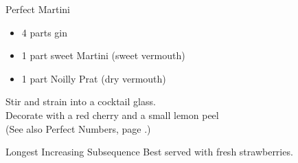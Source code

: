 \begin{algorithm}{Perfect Martini}
\desc
\begin{itemize}
\item 4 parts gin
\item 1 part sweet Martini (sweet vermouth)
\item 1 part Noilly Prat (dry vermouth)
\end{itemize}
Stir and strain into a cocktail glass.\\
Decorate with a red cherry and a small lemon peel\\
(See also Perfect Numbers, page \pageref{perfnum}.)
\end{algorithm}

\begin{algorithm}{Longest Increasing Subsequence}
\desc Best served with fresh strawberries.
\end{algorithm}
